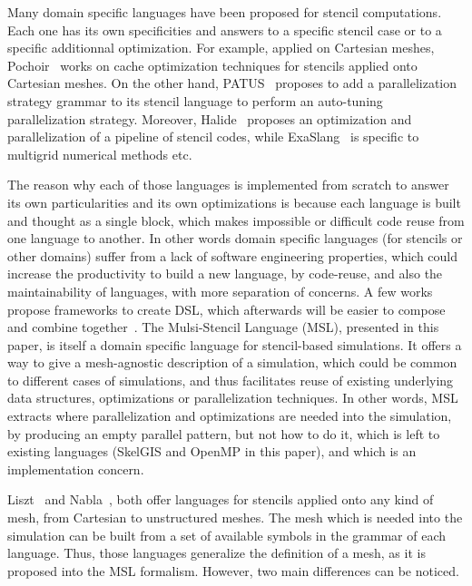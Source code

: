Many domain specific languages have been proposed for stencil computations. Each one has its own specificities and answers to a specific stencil case or to a specific additionnal optimization. For example, applied on Cartesian meshes, Pochoir~\cite{spaaTangCKLL11} works on cache optimization techniques for stencils applied onto Cartesian meshes. On the other hand, PATUS~\cite{citeulike12258902} proposes to add a parallelization strategy grammar to its stencil language to perform an auto-tuning parallelization strategy. Moreover, Halide~\cite{Ragan-Kelley:2013:HLC:2491956.2462176}  proposes an optimization and parallelization of a pipeline of stencil codes, while ExaSlang~\cite{Schmitt:2014:EDL:2691166.2691171} is specific to multigrid numerical methods etc.

The reason why each of those languages is implemented from scratch to answer its own particularities and its own optimizations is because each language is built and thought as a single block, which makes impossible or difficult code reuse from one language to another. In other words domain specific languages (for stencils or other domains) suffer from a lack of software engineering properties, which could increase the productivity to build a new language, by code-reuse, and also the maintainability of languages, with more separation of concerns. A few works propose frameworks to create DSL, which afterwards will be easier to compose and combine together~\cite{Sujeeth:2013:CRC:2524984.2524988}. The Mulsi-Stencil Language (MSL), presented in this paper, is itself a domain specific language for stencil-based simulations. It offers a way to give a mesh-agnostic description of a simulation, which could be common to different cases of simulations, and thus facilitates reuse of existing underlying data structures, optimizations or parallelization techniques. In other words, MSL extracts where parallelization and optimizations are needed into the simulation, by producing an empty parallel pattern, but not how to do it, which is left to existing languages (SkelGIS and OpenMP in this paper), and which is an implementation concern.

Liszt~\cite{DeVito:2011:LDS:2063384.2063396} and Nabla~\cite{Camier:2015:IPP:2820083.2820107}, both offer languages for stencils applied onto any kind of mesh, from Cartesian to unstructured meshes. The mesh which is needed into the simulation can be built from a set of available symbols in the grammar of each language. Thus, those languages generalize the definition of a mesh, as it is proposed into the MSL formalism. 
However, two main differences can be noticed. 

